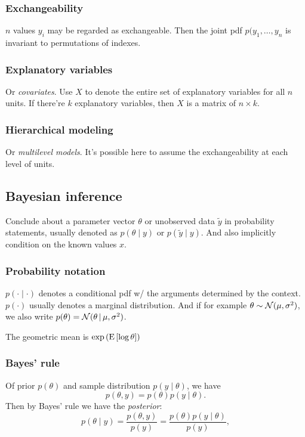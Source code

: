 \documentclass[11pt,a4paper]{article}
\begin{document}
\subsubsection*{Exchangeability}

\(n\) values \(y_i\) may be regarded as exchangeable. Then the joint pdf \(p(y_1,\dots,y_n\) is invariant to permutations of indexes.

\subsubsection*{Explanatory variables}

Or \emph{covariates}. Use \(X\) to denote the entire set of explanatory variables for all \(n\) units. If there're \(k\) explanatory variables, then \(X\) is a matrix of \(n\times k\).

\subsubsection*{Hierarchical modeling}
Or \emph{multilevel models}. It's possible here to assume the exchangeability at each level of units.

\subsection{Bayesian inference}
Conclude about a parameter vector \(\theta\) or unobserved data \(\tilde{ y}\) in probability statements, usually denoted as \(p(\theta\mid y) \) or \(p(\tilde{ y}\mid y)\). And also implicitly condition on the known values \(x\).

\subsubsection*{Probability notation}
\(p(\cdot\mid\cdot)\) denotes a conditional pdf w/ the arguments determined by the context. \(p(\cdot)\) usually denotes a marginal distribution. And if for example \(\theta\sim\mathcal{N}(\mu,\sigma^2)\), we also write \(p(\theta)=\mathcal{N}(\theta\,|\,\mu,\sigma^2)\).

The geometric mean is \(\exp\left( \mathrm{E}\left[ \log\theta \right] \right)\)

\subsubsection*{Bayes' rule}

Of prior \(p(\theta)\) and sample distribution \(p(y\mid\theta)\), we have \[p(\theta,y)=p(\theta)p(y\mid\theta).\] Then by Bayes' rule we have the \emph{posterior}: 
\begin{equation}\label{1.1}
    p(\theta\mid y)=\frac{p(\theta,y)}{p(y)}=\frac{p(\theta)p(y\mid\theta)}{p(y)},    
\end{equation}
\end{document}
